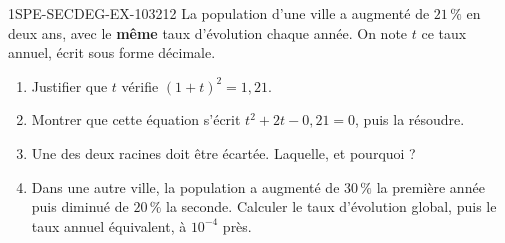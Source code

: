 \begin{exercice}{1SPE-SECDEG-EX-103}{2}{12}
La population d'une ville a augmenté de $21\,\%$ en deux ans, avec le
\textbf{même} taux d'évolution chaque année. On note $t$ ce taux annuel,
écrit sous forme décimale.
\begin{enumerate}
\item Justifier que $t$ vérifie $(1+t)^2 = 1{,}21$.
\item Montrer que cette équation s'écrit $t^2 + 2t - 0{,}21 = 0$, puis la
  résoudre.
\item Une des deux racines doit être écartée. Laquelle, et pourquoi ?
\item Dans une autre ville, la population a augmenté de $30\,\%$ la première
  année puis diminué de $20\,\%$ la seconde. Calculer le taux d'évolution
  global, puis le taux annuel équivalent, à $10^{-4}$ près.
\end{enumerate}
\end{exercice}
